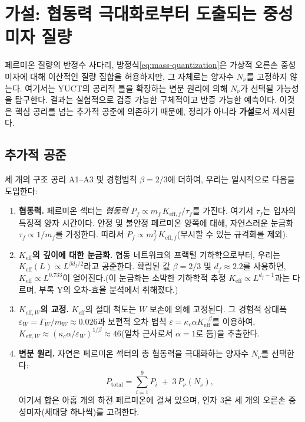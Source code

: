 \documentclass[12pt,a4paper]{article}
\begin{document}
	\section{가설: 협동력 극대화로부터 도출되는 중성미자 질량}
	\label{sec:neutrino-hypothesis}
	
	페르미온 질량의 반정수 사다리, 방정식\eqref{eq:mass-quantization}은 가상적 오른손 중성미자에 대해 이산적인 질량 집합을 허용하지만, 그 자체로는 양자수 \(N_{\nu}\)를 고정하지 않는다. 여기서는 YUCT의 공리적 틀을 확장하는 변분 원리에 의해 \(N_{\nu}\)가 선택될 가능성을 탐구한다. 결과는 실험적으로 검증 가능한 구체적이고 반증 가능한 예측이다. 이것은 핵심 공리를 넘는 추가적 공준에 의존하기 때문에, 정리가 아니라 \textbf{가설}로서 제시된다.
	
	\subsection{추가적 공준}
	
	세 개의 구조 공리 A1--A3 및 경험법칙 \(\beta=2/3\)에 더하여, 우리는 일시적으로 다음을 도입한다:
	
	\begin{enumerate}[label=\textbf{P\arabic*}:, leftmargin=*]
		\item \textbf{협동력.} 페르미온 섹터는 \textit{협동력} \(P_f \propto m_f \, K_{\mathrm{eff},f}/\tau_f\)를 가진다. 여기서 \(\tau_f\)는 입자의 특징적 양자 시간이다. 안정 및 불안정 페르미온 양쪽에 대해, 자연스러운 눈금화 \(\tau_f \propto 1/m_f\)를 가정한다. 따라서 \(P_f \propto m_f^2 \, K_{\mathrm{eff},f}\)(무시할 수 있는 규격화를 제외).
		\item \textbf{\(K_{\mathrm{eff}}\)의 깊이에 대한 눈금화.} 협동 네트워크의 프랙털 기하학으로부터, 우리는 \(K_{\mathrm{eff}}(L) \propto L^{\beta d_f/2}\)라고 공준한다. 확립된 값 \(\beta=2/3\) 및 \(d_f\approx2.2\)를 사용하면, \(K_{\mathrm{eff}} \propto L^{0.733}\)이 얻어진다.(이 눈금화는 소박한 기하학적 추정 \(K_{\mathrm{eff}}\propto L^{d_f-1}\)과는 다르며, 부록 Y의 오차‐효율 분석에서 취해졌다.)
		\item \textbf{\(K_{\mathrm{eff},W}\)의 교정.} \(K_{\mathrm{eff}}\)의 절대 척도는 \(W\) 보손에 의해 고정된다. 그 경험적 상대폭 \(\varepsilon_W = \Gamma_W/m_W \approx 0.026\)과 보편적 오차 법칙 \(\varepsilon = \kappa_c \alpha K_{\mathrm{eff}}^{-\beta}\)를 이용하여, \(K_{\mathrm{eff},W} \approx (\kappa_c \alpha / \varepsilon_W)^{1/\beta} \approx 46\)(일차 근사로서 \(\alpha=1\)로 둠)을 추출한다.
		\item \textbf{변분 원리.} 자연은 페르미온 섹터의 총 협동력을 극대화하는 양자수 \(N_{\nu}\)를 선택한다:
		\begin{equation}
			P_{\mathrm{total}} = \sum_{i=1}^{9} P_i \;+\; 3\,P_{\nu}(N_{\nu}),
		\end{equation}
		여기서 합은 아홉 개의 하전 페르미온에 걸쳐 있으며, 인자 \(3\)은 세 개의 오른손 중성미자(세대당 하나씩)를 고려한다.
	\end{enumerate}
	
\end{document}
